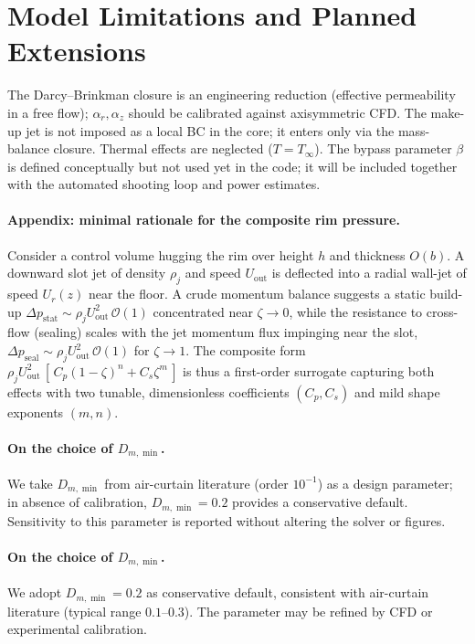 \documentclass[11pt,a4paper]{article}
\begin{document}
\section{Model Limitations and Planned Extensions}
\label{sec:model-limitations-and-planned-extensions}

The Darcy--Brinkman closure is an engineering reduction (effective permeability in a
free flow); $\alpha_r,\alpha_z$ should be calibrated against axisymmetric CFD.
The make-up jet is not imposed as a local BC in the core; it enters only via the
mass-balance closure. Thermal effects are neglected ($T=T_\infty$). The bypass parameter
$\beta$ is defined conceptually but not used yet in the code; it will be included together
with the automated shooting loop and power estimates.

\paragraph{Appendix: minimal rationale for the composite rim pressure.}
Consider a control volume hugging the rim over height $h$ and thickness $O(b)$.
A downward slot jet of density $\rho_j$ and speed $U_{\mathrm{out}}$ is deflected
into a radial wall-jet of speed $U_r(z)$ near the floor. A crude momentum balance
suggests a static build-up $\Delta p_{\mathrm{stat}}\sim \rho_j U_{\mathrm{out}}^2
\,\mathcal{O}(1)$ concentrated near $\zeta\!\to\!0$, while the resistance to
cross-flow (sealing) scales with the jet momentum flux impinging near the slot,
$\Delta p_{\mathrm{seal}}\sim \rho_j U_{\mathrm{out}}^2\,\mathcal{O}(1)$ for
$\zeta\!\to\!1$. The composite form
$\rho_j U_{\mathrm{out}}^2\,[\,C_p(1-\zeta)^n + C_s \zeta^m\,]$ is thus a
first-order surrogate capturing both effects with two tunable, dimensionless
coefficients $(C_p,C_s)$ and mild shape exponents $(m,n)$.

\paragraph{On the choice of $D_{m,\min}$.}
We take $D_{m,\min}$ from air-curtain literature (order $10^{-1}$) as a design parameter; in absence of calibration, $D_{m,\min}=0.2$ provides a conservative default.
Sensitivity to this parameter is reported without altering the solver or figures.

\paragraph{On the choice of $D_{m,\min}$.}
We adopt $D_{m,\min}=0.2$ as conservative default, consistent with air-curtain literature (typical range $0.1$--$0.3$). The parameter may be refined by CFD or experimental calibration.
\end{document}
